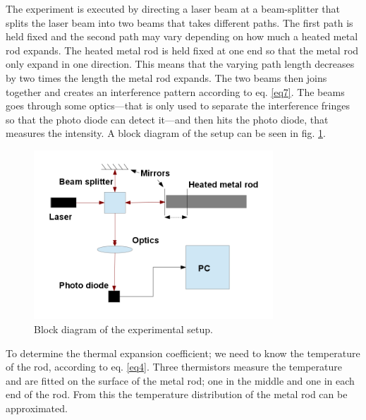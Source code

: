 The experiment is executed by directing a laser beam at a beam-splitter that splits the laser beam into two beams that takes different paths. The first path is held fixed and the second path may vary depending on how much a heated metal rod expands. The heated metal rod is held fixed at one end so that the metal rod only expand in one direction. This means that the varying path length decreases by two times the length the metal rod expands. The two beams then joins together and creates an interference pattern according to eq. \eqref{eq7}. The beams goes through some optics---that is only used to separate the interference fringes so that the photo diode can detect it---and then hits the photo diode, that measures the intensity.
A block diagram of the setup can be seen in fig. \ref{fig:blockSetup}.

\begin{figure}[htbp]
	\centering
	\includegraphics[width=0.8\textwidth]{img/blockSetup}
	\caption{Block diagram of the experimental setup.}
	\label{fig:blockSetup}
\end{figure}

\FloatBarrier
To determine the thermal expansion coefficient; we need to know the temperature of the rod, according to eq. \eqref{eq4}. Three thermistors measure the temperature and are fitted on the surface of the metal rod; one in the middle and one in each end of the rod. From this the temperature distribution of the metal rod can be approximated.